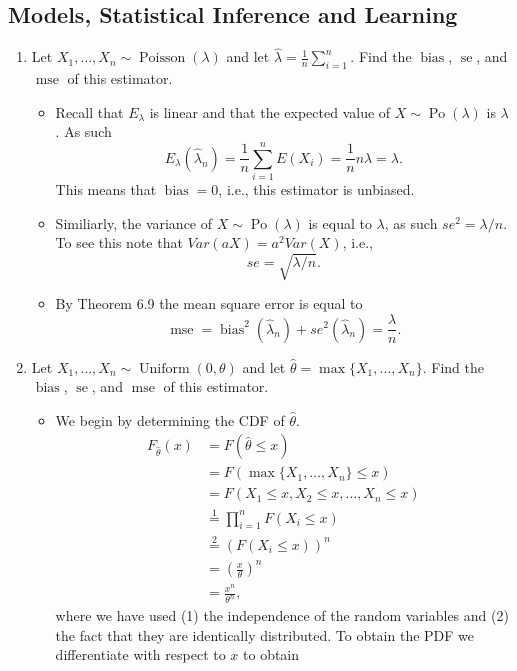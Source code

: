 \documentclass{article}
\newcommand{\mse}{\operatorname{mse}}
\newcommand{\bias}{\operatorname{bias}}
\newcommand{\se}{\operatorname{se}}
\begin{document}
\subsection{Models, Statistical Inference and Learning}
\begin{enumerate}
	\item Let $X_1, \dots, X_n \sim \operatorname{Poisson}(\lambda)$ and let $\hat{\lambda} = \frac{1}{n} \sum_{i = 1}^n$. Find the $\bias$, $\se$, and $\mse$ of this estimator.
		\begin{itemize}
			\item Recall that $E_\lambda$ is linear and that the expected value of $X \sim \operatorname{Po}(\lambda)$ is $\lambda$. As such
			$$
			E_\lambda(\hat{\lambda}_n) = \frac{1}{n} \sum_{i = 1}^n E(X_i) = \frac{1}{n} n \lambda = \lambda.
			$$
			This means that $\bias = 0$, i.e., this estimator is unbiased.
			\item Similiarly, the variance of $X \sim \operatorname{Po}(\lambda)$ is equal to $\lambda$, as such $se^2 = \lambda / n$. To see this note that $Var(aX) = a^2Var(X)$, i.e.,
			$$
			se = \sqrt{\lambda / n}.
			$$
			\item By Theorem 6.9 the mean square error is equal to
			$$
			\mse = \bias^2(\hat{\lambda}_n) + se^2(\hat{\lambda}_n) = \frac{\lambda}{n}.
			$$
		\end{itemize}
	\item Let $X_1, \dots, X_n \sim \operatorname{Uniform}(0, \theta)$ and let $\hat{\theta} = \max\{X_1, \dots, X_n\}$. Find the $\bias$, $\se$, and $\mse$ of this estimator.
		\begin{itemize}
			\item We begin by determining the CDF of $\hat{\theta}$.
			$$
			\begin{aligned}
			F_{\hat{\theta}}(x) &= F(\hat{\theta} \leq x) \\ 
			&= F(\max\{X_1, \dots, X_n\} \leq x) \\
			&= F(X_1 \leq x, X_2 \leq x, \dots, X_n \leq x) \\
			&\overset{1}{=} \prod_{i = 1}^n F(X_i \leq x) \\
			&\overset{2}{=} (F(X_i \leq x))^n \\
			&= \left( \frac{x}{\theta} \right)^n \\
			&= \frac{x^n}{\theta^n},
			\end{aligned}
			$$
			where we have used (1) the independence of the random variables and (2) the fact that they are identically distributed. To obtain the PDF we differentiate with respect to $x$ to obtain

\end{itemize}
\end{enumerate}
\end{document}
